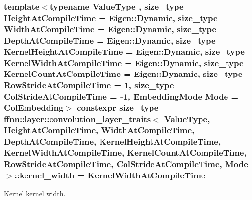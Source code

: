 \hypertarget{structffnn_1_1layer_1_1convolution__layer__traits_a2aafad04475fbeb3b5947ed693859028}{
\subsubsection[{kernel\-\_\-width}]{\setlength{\rightskip}{0pt plus 5cm}template$<$typename Value\-Type , size\-\_\-type Height\-At\-Compile\-Time = Eigen\-::\-Dynamic, size\-\_\-type Width\-At\-Compile\-Time = Eigen\-::\-Dynamic, size\-\_\-type Depth\-At\-Compile\-Time = Eigen\-::\-Dynamic, size\-\_\-type Kernel\-Height\-At\-Compile\-Time = Eigen\-::\-Dynamic, size\-\_\-type Kernel\-Width\-At\-Compile\-Time = Eigen\-::\-Dynamic, size\-\_\-type Kernel\-Count\-At\-Compile\-Time = Eigen\-::\-Dynamic, size\-\_\-type Row\-Stride\-At\-Compile\-Time = 1, size\-\_\-type Col\-Stride\-At\-Compile\-Time = -\/1, Embedding\-Mode Mode = Col\-Embedding$>$ constexpr {\bf size\-\_\-type} {\bf ffnn\-::layer\-::convolution\-\_\-layer\-\_\-traits}$<$ Value\-Type, Height\-At\-Compile\-Time, Width\-At\-Compile\-Time, Depth\-At\-Compile\-Time, Kernel\-Height\-At\-Compile\-Time, Kernel\-Width\-At\-Compile\-Time, Kernel\-Count\-At\-Compile\-Time, Row\-Stride\-At\-Compile\-Time, Col\-Stride\-At\-Compile\-Time, Mode $>$\-::kernel\-\_\-width = Kernel\-Width\-At\-Compile\-Time\hspace{0.3cm}{\ttfamily [static]}}}\label{structffnn_1_1layer_1_1convolution__layer__traits_a2aafad04475fbeb3b5947ed693859028}


Kernel kernel width. 

